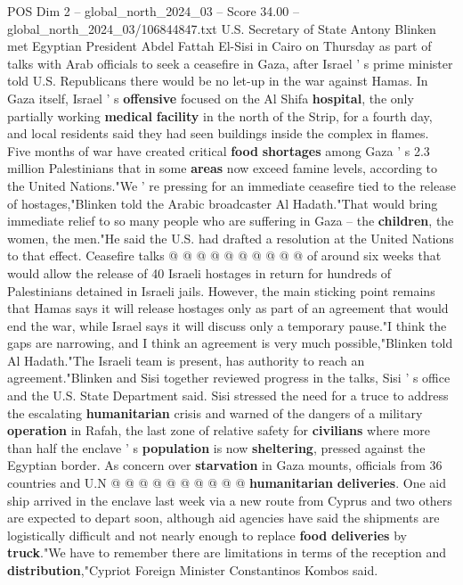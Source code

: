 \begin{textsample}{POS Dim 2 – global\_north\_2024\_03 – Score 34.00 – global\_north\_2024\_03/106844847.txt}  \label{ex:f2_pos_104}
U.S.
Secretary of State Antony Blinken met Egyptian President Abdel Fattah El-Sisi in Cairo on Thursday as part of talks with Arab officials to seek a ceasefire in Gaza, after Israel ' s prime minister told U.S.
Republicans there would be no let-up in the war against Hamas.
In Gaza itself, Israel ' s \textbf{offensive} focused on the Al Shifa \textbf{hospital}, the only partially working \textbf{medical} \textbf{facility} in the north of the Strip, for a fourth day, and local residents said they had seen buildings inside the complex in flames.
Five months of war have created critical \textbf{food} \textbf{shortages} among Gaza ' s 2.3 million Palestinians that in some \textbf{areas} now exceed famine levels, according to the United Nations."We ' re pressing for an immediate ceasefire tied to the release of hostages,"Blinken told the Arabic broadcaster Al Hadath."That would bring immediate relief to so many people who are suffering in Gaza -- the \textbf{children}, the women, the men."He said the U.S. had drafted a resolution at the United Nations to that effect.
Ceasefire talks @ @ @ @ @ @ @ @ @ @ of around six weeks that would allow the release of 40 Israeli hostages in return for hundreds of Palestinians detained in Israeli jails.
However, the main sticking point remains that Hamas says it will release hostages only as part of an agreement that would end the war, while Israel says it will discuss only a temporary pause."I think the gaps are narrowing, and I think an agreement is very much possible,"Blinken told Al Hadath."The Israeli team is present, has authority to reach an agreement."Blinken and Sisi together reviewed progress in the talks, Sisi ' s office and the U.S.
State Department said.
Sisi stressed the need for a truce to address the escalating \textbf{humanitarian} crisis and warned of the dangers of a military \textbf{operation} in Rafah, the last zone of relative safety for \textbf{civilians} where more than half the enclave ' s \textbf{population} is now \textbf{sheltering}, pressed against the Egyptian border.
As concern over \textbf{starvation} in Gaza mounts, officials from 36 countries and U.N @ @ @ @ @ @ @ @ @ @ \textbf{humanitarian} \textbf{deliveries}.
One aid ship arrived in the enclave last week via a new route from Cyprus and two others are expected to depart soon, although aid agencies have said the shipments are logistically difficult and not nearly enough to replace \textbf{food} \textbf{deliveries} by \textbf{truck}."We have to remember there are limitations in terms of the reception and \textbf{distribution},"Cypriot Foreign Minister Constantinos Kombos said.

\end{textsample}
